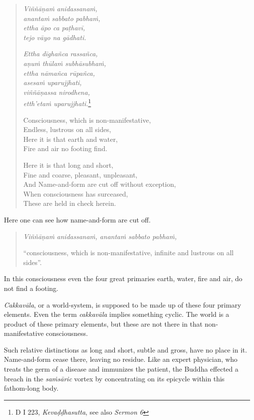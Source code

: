 \begin{quote}
\emph{Viññāṇaṁ anidassanaṁ,}\\
\emph{anantaṁ sabbato pabhaṁ,}\\
\emph{ettha āpo ca paṭhavī,}\\
\emph{tejo vāyo na gādhati.}

\emph{Ettha dīghañca rassañca,}\\
\emph{aṇuṁ thūlaṁ subhāsubhaṁ,}\\
\emph{ettha nāmañca rūpañca,}\\
\emph{asesaṁ uparujjhati,}\\
\emph{viññāṇassa nirodhena,}\\
\emph{etth'etaṁ uparujjhati.}\footnote{D I 223, \emph{Kevaḍḍhasutta}, see also \emph{Sermon 6}}

Consciousness, which is non-manifestative,\\
Endless, lustrous on all sides,\\
Here it is that earth and water,\\
Fire and air no footing find.

Here it is that long and short,\\
Fine and coarse, pleasant, unpleasant,\\
And Name-and-form are cut off without exception,\\
When consciousness has surceased,\\
These are held in check herein.
\end{quote}

Here one can see how name-and-form are cut off.

\begin{quote}
\emph{Viññāṇaṁ anidassanaṁ, anantaṁ sabbato pabhaṁ,}

``consciousness, which is non-manifestative, infinite and lustrous on all sides''.
\end{quote}

In this consciousness even the four great primaries earth, water, fire and air, do not find a footing.

\emph{Cakkavāla}, or a world-system, is supposed to be made up of these four primary elements. Even the term \emph{cakkavāla} implies something cyclic. The world is a product of these primary elements, but these are not there in that non-manifestative consciousness.

Such relative distinctions as long and short, subtle and gross, have no place in it. Name-and-form cease there, leaving no residue. Like an expert physician, who treats the germ of a disease and immunizes the patient, the Buddha effected a breach in the \emph{saṁsāric} vortex by concentrating on its epicycle within this fathom-long body.

